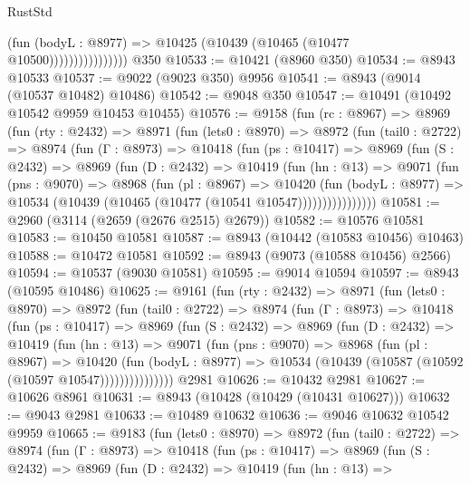 \begin{lexlean}{RustStd}
\begin{coremodule}
                            (fun (bodyL : @8977) =>
                            @10425 (@10439 (@10465 (@10477 @10500))))))))))))))))
    @350
@10533 := @10421 (@8960 @350)
@10534 := @8943 @10533
@10537 := @9022 (@9023 @350) @9956
@10541 := @8943 (@9014 (@10537 @10482) @10486)
@10542 := @9048 @350
@10547 := @10491 (@10492 @10542 @9959 @10453 @10455)
@10576 := @9158
    (fun (rc : @8967) =>
    @8969
      (fun (rty : @2432) =>
      @8971
        (fun (lets0 : @8970) =>
        @8972
          (fun (tail0 : @2722) =>
          @8974
            (fun (Γ : @8973) =>
            @10418
              (fun (ps : @10417) =>
              @8969
                (fun (S : @2432) =>
                @8969
                  (fun (D : @2432) =>
                  @10419
                    (fun (hn : @13) =>
                    @9071
                      (fun (pns : @9070) =>
                      @8968
                        (fun (pl : @8967) =>
                        @10420
                          (fun (bodyL : @8977) =>
                          @10534 (@10439 (@10465 (@10477 (@10541 @10547))))))))))))))))
@10581 := @2960 (@3114 (@2659 (@2676 @2515) @2679))
@10582 := @10576 @10581
@10583 := @10450 @10581
@10587 := @8943 (@10442 (@10583 @10456) @10463)
@10588 := @10472 @10581
@10592 := @8943 (@9073 (@10588 @10456) @2566)
@10594 := @10537 (@9030 @10581)
@10595 := @9014 @10594
@10597 := @8943 (@10595 @10486)
@10625 := @9161
    (fun (rty : @2432) =>
    @8971
      (fun (lets0 : @8970) =>
      @8972
        (fun (tail0 : @2722) =>
        @8974
          (fun (Γ : @8973) =>
          @10418
            (fun (ps : @10417) =>
            @8969
              (fun (S : @2432) =>
              @8969
                (fun (D : @2432) =>
                @10419
                  (fun (hn : @13) =>
                  @9071
                    (fun (pns : @9070) =>
                    @8968
                      (fun (pl : @8967) =>
                      @10420
                        (fun (bodyL : @8977) =>
                        @10534 (@10439 (@10587 (@10592 (@10597 @10547)))))))))))))))
    @2981
@10626 := @10432 @2981
@10627 := @10626 @8961
@10631 := @8943 (@10428 (@10429 (@10431 @10627)))
@10632 := @9043 @2981
@10633 := @10489 @10632
@10636 := @9046 @10632 @10542 @9959
@10665 := @9183
    (fun (lets0 : @8970) =>
    @8972
      (fun (tail0 : @2722) =>
      @8974
        (fun (Γ : @8973) =>
        @10418
          (fun (ps : @10417) =>
          @8969
            (fun (S : @2432) =>
            @8969
              (fun (D : @2432) =>
              @10419
                (fun (hn : @13) =>

\end{coremodule}
\end{lexlean}
